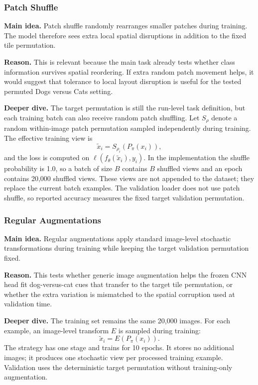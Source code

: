 \documentclass[12pt]{article}
\begin{document}
\subsubsection{Patch Shuffle}

\textbf{Main idea.} Patch shuffle randomly rearranges smaller patches during training. The model therefore sees extra local spatial disruptions in addition to the fixed tile permutation.

\textbf{Reason.} This is relevant because the main task already tests whether class information survives spatial reordering. If extra random patch movement helps, it would suggest that tolerance to local layout disruption is useful for the tested permuted Dogs versus Cats setting.

\textbf{Deeper dive.} The target permutation is still the run-level task definition, but each training batch can also receive random patch shuffling. Let $S_{\rho}$ denote a random within-image patch permutation sampled independently during training. The effective training view is
\[
  \tilde{x}_i = S_{\rho_i}\!\left(P_{\pi}(x_i)\right),
\]
and the loss is computed on $\ell(f_{\theta}(\tilde{x}_i),y_i)$. In the implementation the shuffle probability is 1.0, so a batch of size $B$ contains $B$ shuffled views and an epoch contains 20,000 shuffled views. These views are not appended to the dataset; they replace the current batch examples. The validation loader does not use patch shuffle, so reported accuracy measures the fixed target validation permutation.

\subsubsection{Regular Augmentations}

\textbf{Main idea.} Regular augmentations apply standard image-level stochastic transformations during training while keeping the target validation permutation fixed.

\textbf{Reason.} This tests whether generic image augmentation helps the frozen CNN head fit dog-versus-cat cues that transfer to the target tile permutation, or whether the extra variation is mismatched to the spatial corruption used at validation time.

\textbf{Deeper dive.} The training set remains the same 20,000 images. For each example, an image-level transform $E$ is sampled during training:
\[
  \tilde{x}_i = E\!\left(P_{\pi}(x_i)\right).
\]
The strategy has one stage and trains for 10 epochs. It stores no additional images; it produces one stochastic view per processed training example. Validation uses the deterministic target permutation without training-only augmentation.
\end{document}
